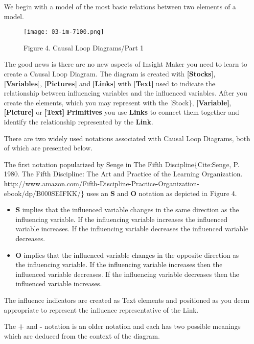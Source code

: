 \documentclass[]{memoir}
\let\Oldincludegraphics\includegraphics
\renewcommand{\includegraphics}[1]{\Oldincludegraphics[max size={\textwidth}{\textheight}]{#1}}
\newcommand{\p}[1]{\textbf{{[}#1{]}}}
\renewcommand{\u}[1]{\textbf{#1}}
\begin{document}
We begin with a model of the most basic relations between two elements
of a model.

\begin{figure}[htbp]
\centering
\texttt{[image: 03-im-7100.png]}
\caption{Figure 4. Causal Loop Diagrams/Part 1}
\end{figure}

The good news is there are no new aspects of Insight Maker you need to
learn to create a Causal Loop Diagram. The diagram is created with
\p{Stocks}, \p{Variables}, \p{Pictures} and \p{Links} with \p{Text} used
to indicate the relationship between influencing variables and the
influenced variables. After you create the elements, which you may
represent with the {[}Stock\}, \p{Variable}, \p{Picture} or \p{Text}
\u{Primitives} you use \u{Links} to connect them together and identify
the relationship represented by the \u{Link}.

There are two widely used notations associated with Causal Loop
Diagrams, both of which are presented below.

The first notation popularized by Senge in The Fifth
Discipline\{Cite:Senge, P. 1980. The Fifth Discipline: The Art and
Practice of the Learning Organization.
http://www.amazon.com/Fifth-Discipline-Practice-Organization-ebook/dp/B000SEIFKK/\}
uses an \textbf{S} and \textbf{O} notation as depicted in Figure 4.

\begin{itemize}
\itemsep1pt\parskip0pt
\item
  \textbf{S} implies that the influenced variable changes in the same
  direction as the influencing variable. If the influencing variable
  increases the influenced variable increases. If the influencing
  variable decreases the influenced variable decreases.
\item
  \textbf{O} implies that the influenced variable changes in the
  opposite direction as the influencing variable. If the influencing
  variable increases then the influenced variable decreases. If the
  influencing variable decreases then the influenced variable increases.
\end{itemize}

The influence indicators are created as Text elements and positioned as
you deem appropriate to represent the influence representative of the
Link.

The \textbf{+} and \textbf{-} notation is an older notation and each has
two possible meanings which are deduced from the context of the diagram.
\end{document}
